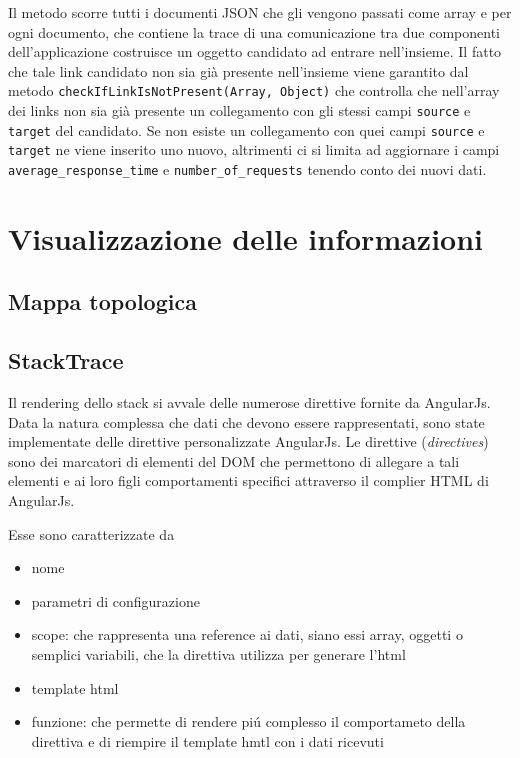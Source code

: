 	Il metodo scorre tutti i documenti JSON che gli vengono passati come array e per ogni documento, che contiene la trace di una comunicazione tra due componenti dell'applicazione costruisce un oggetto candidato ad entrare nell'insieme. Il fatto che tale link candidato non sia già presente nell'insieme viene garantito dal metodo \texttt{checkIfLinkIsNotPresent(Array, Object)} che controlla che nell'array dei links non sia già presente un collegamento con gli stessi campi \texttt{source} e \texttt{target} del candidato. Se non esiste un collegamento con quei campi \texttt{source} e \texttt{target} ne viene inserito uno nuovo, altrimenti ci si limita ad aggiornare i campi \texttt{average\_response\_time} e \texttt{number\_of\_requests} tenendo conto dei nuovi dati. 

\section{Visualizzazione delle informazioni}

\subsection{Mappa topologica}

\subsection{StackTrace}
	Il rendering dello stack si avvale delle numerose direttive fornite da
AngularJs. \\Data la natura complessa che dati che devono essere rappresentati, sono state
implementate delle direttive personalizzate AngularJs.
Le direttive (\emph{directives}) sono dei marcatori di elementi del DOM che permettono di allegare
a tali elementi e ai loro figli comportamenti specifici attraverso il complier
HTML di AngularJs.

Esse sono  caratterizzate da
	\begin{itemize}
		\item nome
		\item parametri di configurazione
		\item scope:  che rappresenta una reference ai dati, siano essi array, oggetti o
				semplici variabili, che la direttiva utilizza per generare l'html
		\item template html
		\item funzione: che permette di rendere piú complesso il comportameto della direttiva
					e di riempire il template hmtl con i dati ricevuti
	\end{itemize}

